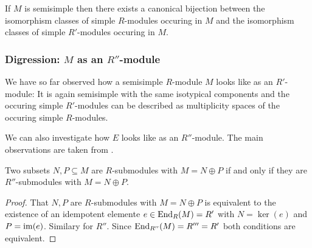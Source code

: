 \begin{corollary}
  If $M$ is semisimple then there exists a canonical bijection between the isomorphism classes of simple $R$-modules occuring in $M$ and the isomorphism classes of simple $R'$-modules occuring in $M$.
\end{corollary}









\subsubsection{Digression: $M$ as an $R''$-module}

\begin{fluff}
  We have so far observed how a semisimple $R$-module $M$ looks like as an $R'$-module:
  It is again semisimple with the same isotypical components and the occuring simple $R'$-modules can be described as multiplicity spaces of the occuring simple $R$-modules.
  
  We can also investigate how $E$ looks like as an $R''$-module.
  The main observations are taken from \cite[Chapter~2.6]{DaSilva2017NonCommutative}.
\end{fluff}


\begin{lemma}
  \label{lemma: same direct sum decompositions}
  Two subsets $N, P \subseteq M$ are $R$-submodules with $M = N \oplus P$ if and only if they are $R''$-submodules with $M = N \oplus P$.
\end{lemma}


\begin{proof}
  That $N, P$ are $R$-submodules with $M = N \oplus P$ is equivalent to the existence of an idempotent elemente $e \in \operatorname{End}_R(M) = R'$ with $N = \ker(e)$ and $P = \operatorname{im}(e)$.
  Similary for $R''$.
  Since $\operatorname{End}_{R''}(M) = R''' = R'$ both conditions are equivalent.
\end{proof}


